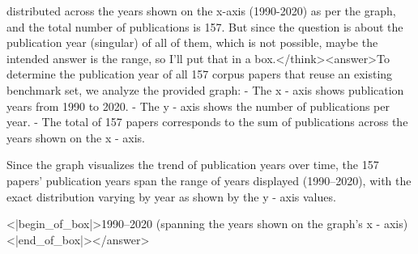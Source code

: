distributed across the years shown on the x-axis (1990-2020) as per the graph, and the total number of publications is 157. But since the question is about the publication year (singular) of all of them, which is not possible, maybe the intended answer is the range, so I'll put that in a box.</think><answer>To determine the publication year of all 157 corpus papers that reuse an existing benchmark set, we analyze the provided graph:  
- The x - axis shows publication years from 1990 to 2020.  
- The y - axis shows the number of publications per year.  
- The total of 157 papers corresponds to the sum of publications across the years shown on the x - axis.  

Since the graph visualizes the trend of publication years over time, the 157 papers’ publication years span the range of years displayed (1990–2020), with the exact distribution varying by year as shown by the y - axis values.  

<|begin_of_box|>1990–2020 (spanning the years shown on the graph’s x - axis)<|end_of_box|></answer>